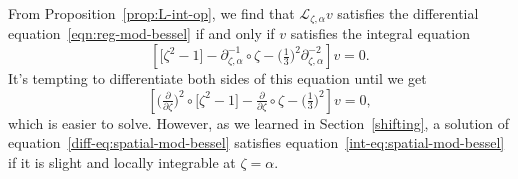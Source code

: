 \documentclass{article}
\newcommand{\fracderiv}[3]{\partial^{#1}_{#2, #3}}
\newcommand{\laplace}{\mathcal{L}}
\theoremstyle{definition}
\theoremstyle{plain}
\newenvironment{old}{\color{RoyalBlue}}{\color{black}}
\begin{document}
\begin{old}
From Proposition~\ref{prop:L-int-op}, we find that $\laplace_{\zeta, \alpha} v$ satisfies the differential equation~\eqref{eqn:reg-mod-bessel} if and only if $v$ satisfies the integral equation
\begin{equation}\label{int-eq:spatial-mod-bessel}
\left[ \big[ \zeta^2 - 1 \big] - \fracderiv{-1}{\zeta}{\alpha} \circ \zeta - \big(\tfrac{1}{3}\big)^2 \fracderiv{-2}{\zeta}{\alpha} \right] v = 0.
\end{equation}
It's tempting to differentiate both sides of this equation until we get
\begin{equation}\label{diff-eq:spatial-mod-bessel}
\left[ \big(\tfrac{\partial}{\partial \zeta}\big)^2 \circ \big[ \zeta^2 - 1 \big] - \tfrac{\partial}{\partial \zeta} \circ \zeta - \big(\tfrac{1}{3}\big)^2 \right] v = 0,
\end{equation}
which is easier to solve. However, as we learned in Section~\ref{shifting}, a solution of equation~\eqref{diff-eq:spatial-mod-bessel} satisfies equation~\eqref{int-eq:spatial-mod-bessel} if it is slight and locally integrable at $\zeta = \alpha$. 


\end{old}
\end{document}

